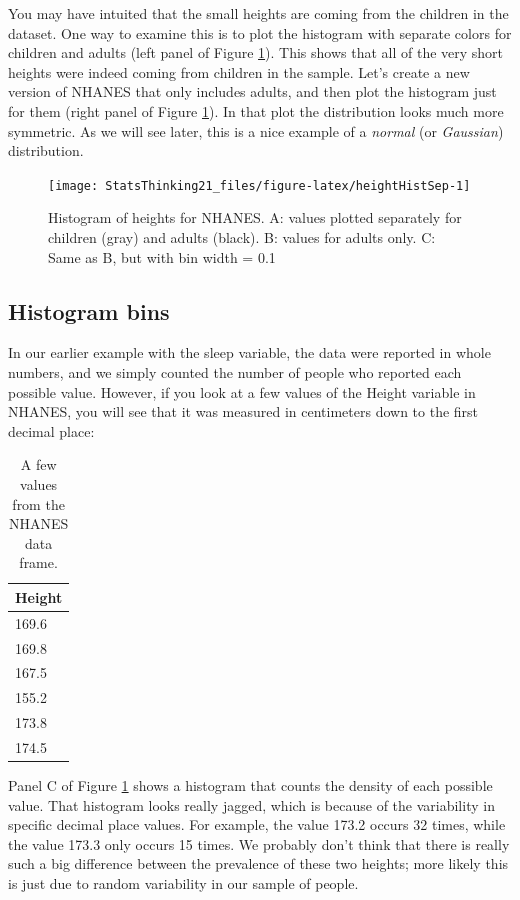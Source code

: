\documentclass[12pt,]{book}
\theoremstyle{definition}
\theoremstyle{definition}
\theoremstyle{definition}
\theoremstyle{remark}
\begin{document}
You may have intuited that the small heights are coming from the children in the dataset. One way to examine this is to plot the histogram with separate colors for children and adults (left panel of Figure \ref{fig:heightHistSep}). This shows that all of the very short heights were indeed coming from children in the sample. Let's create a new version of NHANES that only includes adults, and then plot the histogram just for them (right panel of Figure \ref{fig:heightHistSep}). In that plot the distribution looks much more symmetric. As we will see later, this is a nice example of a \emph{normal} (or \emph{Gaussian}) distribution.

\begin{figure}
\texttt{[image: StatsThinking21\_files/figure-latex/heightHistSep-1]} \caption{Histogram of heights for NHANES. A: values plotted separately for children (gray) and adults (black).  B: values for adults only. C: Same as B, but with bin width = 0.1}\label{fig:heightHistSep}
\end{figure}

\hypertarget{histogram-bins}{%
\subsection{Histogram bins}\label{histogram-bins}}

In our earlier example with the sleep variable, the data were reported in whole numbers, and we simply counted the number of people who reported each possible value. However, if you look at a few values of the Height variable in NHANES, you will see that it was measured in centimeters down to the first decimal place:

\begin{table}

\caption{\label{tab:unnamed-chunk-10}A few values from the NHANES data frame.}
\centering
\begin{tabular}[t]{l}
\hline
Height\\
\hline
169.6\\
\hline
169.8\\
\hline
167.5\\
\hline
155.2\\
\hline
173.8\\
\hline
174.5\\
\hline
\end{tabular}
\end{table}

Panel C of Figure \ref{fig:heightHistSep} shows a histogram that counts the density of each possible value. That histogram looks really jagged, which is because of the variability in specific decimal place values. For example, the value 173.2 occurs 32 times, while the value 173.3 only occurs 15 times. We probably don't think that there is really such a big difference between the prevalence of these two heights; more likely this is just due to random variability in our sample of people.
\end{document}
